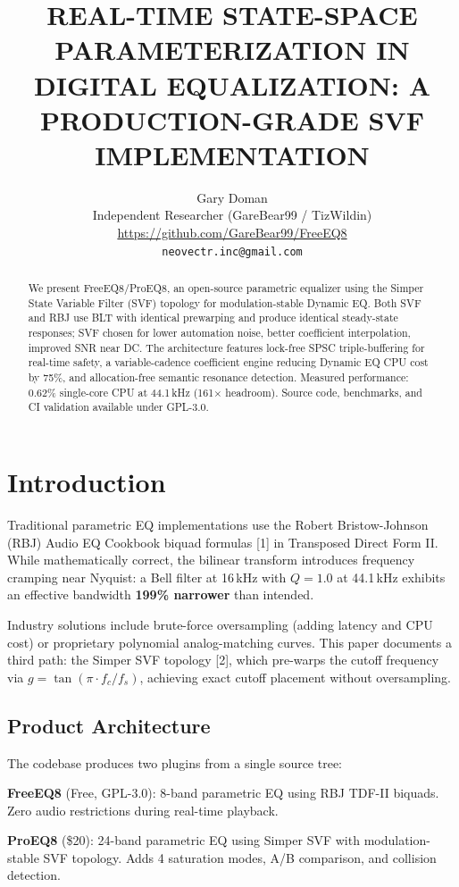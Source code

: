 \documentclass[10pt,twocolumn,a4paper]{article}
\title{\textbf{REAL-TIME STATE-SPACE PARAMETERIZATION IN DIGITAL EQUALIZATION: A PRODUCTION-GRADE SVF IMPLEMENTATION}}
\author{Gary Doman\\
Independent Researcher (GareBear99 / TizWildin)\\
\url{https://github.com/GareBear99/FreeEQ8}\\
\texttt{neovectr.inc@gmail.com}}
\date{}
\begin{document}
\maketitle

\begin{abstract}
We present FreeEQ8/ProEQ8, an open-source parametric equalizer using the Simper State Variable Filter (SVF) topology for modulation-stable Dynamic EQ. Both SVF and RBJ use BLT with identical prewarping and produce identical steady-state responses; SVF chosen for lower automation noise, better coefficient interpolation, improved SNR near DC. The architecture features lock-free SPSC triple-buffering for real-time safety, a variable-cadence coefficient engine reducing Dynamic EQ CPU cost by 75\%, and allocation-free semantic resonance detection. Measured performance: 0.62\% single-core CPU at 44.1\,kHz (161$\times$ headroom). Source code, benchmarks, and CI validation available under GPL-3.0.
\end{abstract}

\section{Introduction}
Traditional parametric EQ implementations use the Robert Bristow-Johnson (RBJ) Audio EQ Cookbook biquad formulas [1] in Transposed Direct Form II. While mathematically correct, the bilinear transform introduces frequency cramping near Nyquist: a Bell filter at 16\,kHz with $Q=1.0$ at 44.1\,kHz exhibits an effective bandwidth \textbf{199\% narrower} than intended.

Industry solutions include brute-force oversampling (adding latency and CPU cost) or proprietary polynomial analog-matching curves. This paper documents a third path: the Simper SVF topology [2], which pre-warps the cutoff frequency via $g = \tan(\pi \cdot f_c / f_s)$, achieving exact cutoff placement without oversampling.

\subsection{Product Architecture}
The codebase produces two plugins from a single source tree:

\textbf{FreeEQ8} (Free, GPL-3.0): 8-band parametric EQ using RBJ TDF-II biquads. Zero audio restrictions during real-time playback.

\textbf{ProEQ8} (\$20): 24-band parametric EQ using Simper SVF with modulation-stable SVF topology. Adds 4 saturation modes, A/B comparison, and collision detection.
\end{document}

